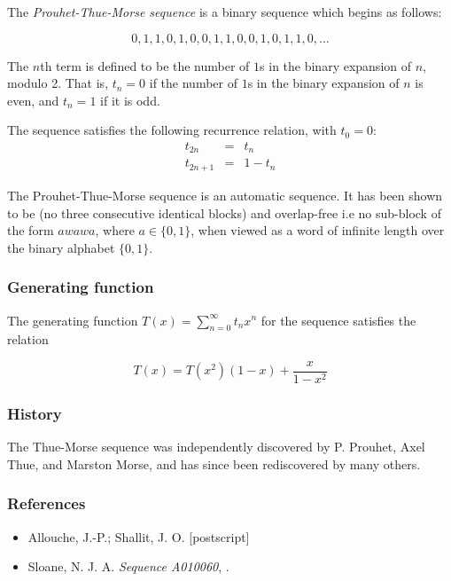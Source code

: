 \documentclass[12pt]{article}
\begin{document}
The {\em Prouhet-Thue-Morse sequence} is a binary sequence which begins as follows:

\[ 0, 1, 1, 0, 1, 0, 0, 1, 1, 0, 0, 1, 0, 1, 1, 0, \ldots \]

The $n$th term is defined to be the number of $1$s in the binary expansion of $n$, modulo 2.  That is, $t_n = 0$ if the number of $1$s in the binary expansion of $n$ is even, and $t_n = 1$ if it is odd.

The sequence satisfies the following recurrence relation, with $t_0=0$:
\[ \begin{array}{ccc} t_{2n} &=& t_n \\
                      t_{2n+1} &=& 1 - t_n \end{array} \]

The Prouhet-Thue-Morse sequence is an automatic sequence.  It has been shown to be 
(no three consecutive identical blocks)  and overlap-free 
i.e no sub-block of the form $awawa$, where $a \in \{0,1\}$, when viewed as a word of infinite length over the binary alphabet $\{0,1\}$.

\subsubsection*{Generating function}

The generating function $T(x)=\sum_{n=0}^{\infty} t_nx^n$ for the sequence satisfies the relation

\[ T(x) = T(x^2)(1-x) + \frac{x}{1-x^2} \]

\subsubsection*{History}

The Thue-Morse sequence was independently discovered by P. Prouhet, Axel Thue, and Marston Morse, and has since been rediscovered by many others.

\subsubsection*{References}
\begin{itemize}
\item Allouche, J.-P.; Shallit, J. O.   [postscript]
\item 
Sloane, N. J. A.  { \it Sequence A010060}, .
\end{itemize}
\end{document}
